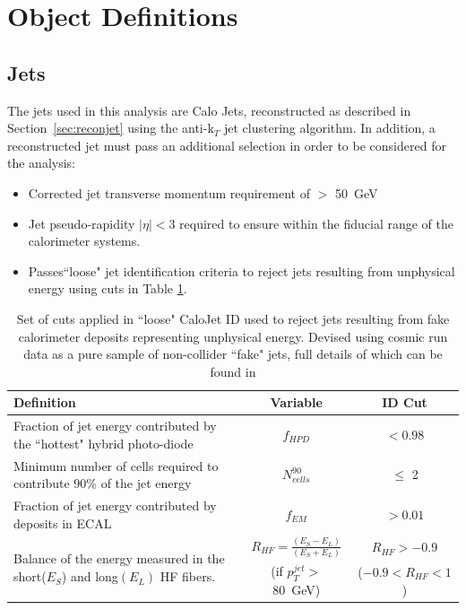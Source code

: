 \section{Object Definitions}

\subsection{Jets}
The jets used in this analysis are Calo Jets, reconstructed as described in Section~\ref{sec:reconjet} using the anti-k$_{T}$ jet clustering algorithm. In addition, a reconstructed jet must pass an additional selection in order to be considered for the analysis:
\begin{itemize}
\item Corrected jet transverse momentum requirement of \Pt $>$ 50~GeV 
\item Jet pseudo-rapidity $|\eta| < 3$ required to ensure within the fiducial range of the calorimeter systems. 
\item Passes``loose" jet identification criteria to reject jets resulting from unphysical energy using cuts in Table \ref{tab:jetid}. 
\end{itemize}

\begin{table}[htbp]
\centering
\begin{tabular}{ m{6.6cm}  c  c }
\hline
\hline
 \centering Definition & Variable & ID Cut \\
\hline
\hline
 \centering Fraction of jet energy contributed by the ``hottest" hybrid photo-diode &  $f_{HPD}$ & $< 0.98$ \\
 \hline
 \centering Minimum number of cells required to contribute 90\% of the jet energy & $N^{90}_{cells}$ & $\leq$ 2 \\
 \hline
 \centering Fraction of jet energy contributed by deposits in ECAL & $f_{EM}$ & $> 0.01$ \\
 \hline
\multirow{2}{6.9cm}{Balance of the energy measured in the short($E_{S}$) and long$(E_{L})$ HF fibers.} &  $R_{HF} = \frac{(E_{S} - E_{L})}{ (E_{S} + E_{L})}$ & $R_{HF} > - 0.9$\\
& (if  $p_{T}^{jet}>$ 80~GeV)  &             ($-0.9 < R_{HF} < 1$)\\
\hline
\end{tabular}
\caption{\label{tab:jetid} Set of cuts applied in ``loose" CaloJet ID used to reject jets resulting from fake calorimeter deposits representing unphysical energy. Devised using cosmic run data as a pure sample of non-collider ``fake" jets, full details of which can be found in \cite{JME-09-008}}
\end{table}


